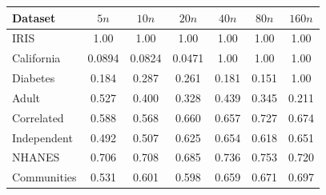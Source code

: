 \begin{tabular}{lcccccc}
\toprule
Dataset & $5n$ & $10n$ & $20n$ & $40n$ & $80n$ & $160n$ \\
\midrule
IRIS & 1.00 & 1.00 & 1.00 & 1.00 & 1.00 & 1.00 \\
California & 0.0894 & 0.0824 & 0.0471 & 1.00 & 1.00 & 1.00 \\
Diabetes & 0.184 & 0.287 & 0.261 & 0.181 & 0.151 & 1.00 \\
Adult & 0.527 & 0.400 & 0.328 & 0.439 & 0.345 & 0.211 \\
Correlated & 0.588 & 0.568 & 0.660 & 0.657 & 0.727 & 0.674 \\
Independent & 0.492 & 0.507 & 0.625 & 0.654 & 0.618 & 0.651 \\
NHANES & 0.706 & 0.708 & 0.685 & 0.736 & 0.753 & 0.720 \\
Communities & 0.531 & 0.601 & 0.598 & 0.659 & 0.671 & 0.697 \\
\bottomrule
\end{tabular}
